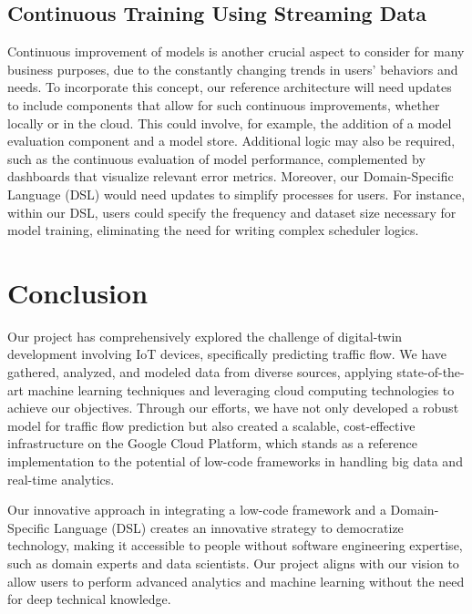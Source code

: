 \subsection{Continuous Training Using Streaming Data}

Continuous improvement of models is another crucial aspect to consider for many business purposes, due to the constantly changing trends in users' behaviors and needs. To incorporate this concept, our reference architecture will need updates to include components that allow for such continuous improvements, whether locally or in the cloud. This could involve, for example, the addition of a model evaluation component and a model store. Additional logic may also be required, such as the continuous evaluation of model performance, complemented by dashboards that visualize relevant error metrics. Moreover, our Domain-Specific Language (DSL) would need updates to simplify processes for users. For instance, within our DSL, users could specify the frequency and dataset size necessary for model training, eliminating the need for writing complex scheduler logics.

\section{Conclusion}

Our project has comprehensively explored the challenge of digital-twin development involving IoT devices, specifically predicting traffic flow. We have gathered, analyzed, and modeled data from diverse sources, applying state-of-the-art machine learning techniques and leveraging cloud computing technologies to achieve our objectives. Through our efforts, we have not only developed a robust model for traffic flow prediction but also created a scalable, cost-effective infrastructure on the Google Cloud Platform, which stands as a reference implementation to the potential of low-code frameworks in handling big data and real-time analytics.

Our innovative approach in integrating a low-code framework and a Domain-Specific Language (DSL) creates an innovative strategy to democratize technology, making it accessible to people without software engineering expertise, such as domain experts and data scientists. Our project aligns with our vision to allow users to perform advanced analytics and machine learning without the need for deep technical knowledge.
